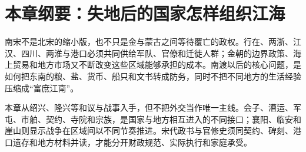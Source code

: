 \section{本章纲要：失地后的国家怎样组织江海}

南宋不是北宋的缩小版，也不只是金与蒙古之间等待覆亡的政权。行在、两浙、江汉、四川、两淮与港口必须共同供给军队、官僚和迁徙人群；金朝的边界政策、海上贸易和地方市场又不断改变这些区域能够承担的成本。南渡以后的核心问题，是如何把东南的粮、盐、货币、船只和文书转成防务，同时不把不同地方的生活经验压缩成“富庶江南”。

本章从绍兴、隆兴等和议与战事入手，但不把外交当作唯一主线。会子、漕运、军屯、市舶、契约、寺院和宗族，是国家与地方相互进入的不同接口；襄阳、临安和崖山则显示战争在区域间以不同节奏推进。宋代政书与官修史须同契约、碑刻、港口遗存和地方材料并读，才能分开财政规范、实际执行和家庭承受。
